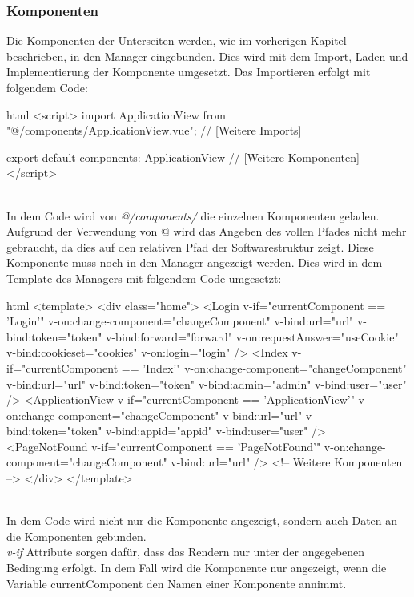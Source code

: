 \subsubsection{Komponenten}
Die Komponenten der Unterseiten werden, wie im vorherigen Kapitel beschrieben, in den Manager eingebunden. Dies wird mit dem Import, Laden und Implementierung der Komponente umgesetzt.
Das Importieren erfolgt mit folgendem Code:
\begin{code}{html}
	<script>
	import ApplicationView from "@/components/ApplicationView.vue";
	// [Weitere Imports]
	
	export default {
		components: {
			ApplicationView
			// [Weitere Komponenten]
		}
	}
</script>
\end{code}
~\\
In dem Code wird von \textit{@/components/} die einzelnen Komponenten geladen. Aufgrund der Verwendung von @ wird das Angeben des vollen Pfades nicht mehr gebraucht, da dies auf den relativen Pfad der Softwarestruktur zeigt.
\newpage
Diese Komponente muss noch in den Manager angezeigt werden. Dies wird in dem Template des Managers mit folgendem Code umgesetzt:
\begin{code}{html}
<template>
	<div class="home">
		<Login
			v-if="currentComponent == 'Login'"
			v-on:change-component="changeComponent"
			v-bind:url="url"
			v-bind:token="token"
			v-bind:forward="forward"
			v-on:requestAnswer="useCookie"
			v-bind:cookieset="cookies"
			v-on:login="login"
		/>
		<Index
			v-if="currentComponent == 'Index'"
			v-on:change-component="changeComponent"
			v-bind:url="url"
			v-bind:token="token"
			v-bind:admin="admin"
			v-bind:user="user"
		/>
		<ApplicationView
			v-if="currentComponent == 'ApplicationView'"
			v-on:change-component="changeComponent"
			v-bind:url="url"
			v-bind:token="token"
			v-bind:appid="appid"
			v-bind:user="user"
		/>
		<PageNotFound
			v-if="currentComponent == 'PageNotFound'"
			v-on:change-component="changeComponent"
			v-bind:url="url"
		/>
		<!-- Weitere Komponenten -->
	</div>
</template>
\end{code}
~\\
In dem Code wird nicht nur die Komponente angezeigt, sondern auch Daten an die Komponenten gebunden.\\
\textit{v-if} Attribute sorgen dafür, dass das Rendern nur unter der angegebenen Bedingung erfolgt. In dem Fall wird die Komponente nur angezeigt, wenn die Variable currentComponent den Namen einer Komponente annimmt.\\
